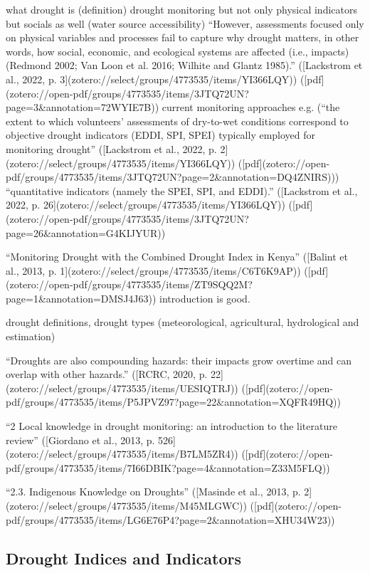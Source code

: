 {what drought is (definition)
drought monitoring but not only physical indicators but socials as well (water source accessibility) “However, assessments focused only on physical variables and processes fail to capture why drought matters, in other words, how social, economic, and ecological systems are affected (i.e., impacts) (Redmond 2002; Van Loon et al. 2016; Wilhite and Glantz 1985).” ([Lackstrom et al., 2022, p. 3](zotero://select/groups/4773535/items/YI366LQY)) ([pdf](zotero://open-pdf/groups/4773535/items/3JTQ72UN?page=3\&annotation=72WYIE7B))
current monitoring approaches e.g. (“the extent to which volunteers’ assessments of dry-to-wet conditions correspond to objective drought indicators (EDDI, SPI, SPEI) typically employed for monitoring drought” ([Lackstrom et al., 2022, p. 2](zotero://select/groups/4773535/items/YI366LQY)) ([pdf](zotero://open-pdf/groups/4773535/items/3JTQ72UN?page=2\&annotation=DQ4ZNIRS)))
“quantitative indicators (namely the SPEI, SPI, and EDDI).” ([Lackstrom et al., 2022, p. 26](zotero://select/groups/4773535/items/YI366LQY)) ([pdf](zotero://open-pdf/groups/4773535/items/3JTQ72UN?page=26\&annotation=G4KIJYUR))

“Monitoring Drought with the Combined Drought Index in Kenya” ([Balint et al., 2013, p. 1](zotero://select/groups/4773535/items/C6T6K9AP)) ([pdf](zotero://open-pdf/groups/4773535/items/ZT9SQQ2M?page=1\&annotation=DMSJ4J63))
introduction is good.

drought definitions, drought types (meteorological, agricultural, hydrological and estimation)

“Droughts are also compounding hazards: their impacts grow overtime and can overlap with other hazards.” ([RCRC, 2020, p. 22](zotero://select/groups/4773535/items/UESIQTRJ)) ([pdf](zotero://open-pdf/groups/4773535/items/P5JPVZ97?page=22&annotation=XQFR49HQ))

“2 Local knowledge in drought monitoring: an introduction to the literature review” ([Giordano et al., 2013, p. 526](zotero://select/groups/4773535/items/B7LM5ZR4)) ([pdf](zotero://open-pdf/groups/4773535/items/7I66DBIK?page=4&annotation=Z33M5FLQ))

“2.3. Indigenous Knowledge on Droughts” ([Masinde et al., 2013, p. 2](zotero://select/groups/4773535/items/M45MLGWC)) ([pdf](zotero://open-pdf/groups/4773535/items/LG6E76P4?page=2&annotation=XHU34W23))

\subsection{Drought Indices and Indicators}

}
